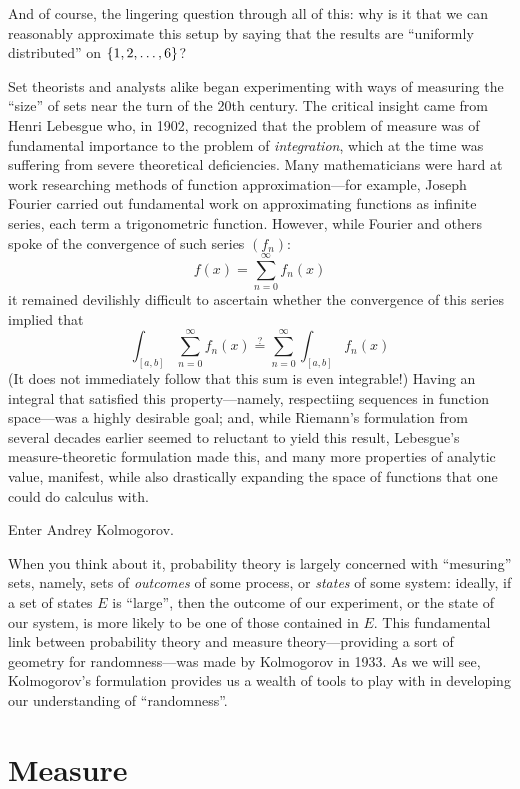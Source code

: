 And of course, the lingering question through all of this: why is it that we can reasonably approximate this setup by saying that the results are ``uniformly distributed'' on $\left\{1,2,\ldots,6\right\}$?

Set theorists and analysts alike began experimenting with ways of measuring the ``size'' of sets near the turn of the 20th century. The critical insight came from Henri Lebesgue who, in 1902, recognized that the problem of measure was of fundamental importance to the problem of \emph{integration}, which at the time was suffering from severe theoretical deficiencies. Many mathematicians were hard at work researching methods of function approximation---for example, Joseph Fourier carried out fundamental work on approximating functions as infinite series, each term a trigonometric function. However, while Fourier and others spoke of the convergence of such series $(f_n)$:
\[ f(x) = \sum_{n = 0}^\infty f_n(x) \]
it remained devilishly difficult to ascertain whether the convergence of this series implied that
\[ \int_{[a,b]} \sum_{n = 0}^\infty f_n(x) \stackrel{?}{=} \sum_{n = 0}^\infty \int_{[a,b]} f_n(x) \]
(It does not immediately follow that this sum is even integrable!) Having an integral that satisfied this property---namely, respectiing sequences in function space---was a highly desirable goal; and, while Riemann's formulation from several decades earlier seemed to reluctant to yield this result, Lebesgue's measure-theoretic formulation made this, and many more properties of analytic value, manifest, while also drastically expanding the space of functions that one could do calculus with.

Enter Andrey Kolmogorov.

When you think about it, probability theory is largely concerned with ``mesuring'' sets, namely, sets of \emph{outcomes} of some process, or \emph{states} of some system: ideally, if a set of states $E$ is ``large'', then the outcome of our experiment, or the state of our system, is more likely to be one of those contained in $E$. This fundamental link between probability theory and measure theory---providing a sort of geometry for randomness---was made by Kolmogorov in 1933. As we will see, Kolmogorov's formulation provides us a wealth of tools to play with in developing our understanding of ``randomness''.

\section{Measure}

